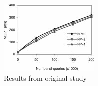 \documentclass[sigconf, nonacm]{acmart}
\begin{document}
\begin{figure}
  \centering
  \includegraphics[width=\linewidth]{figures/reference_figure.png}
  \caption{Results from original study~\cite{yfilter}}
  \label{fig:reference_figure}
\end{figure}





\end{document}
